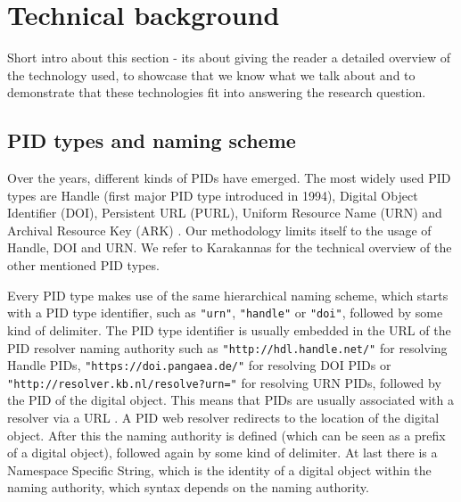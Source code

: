 \section{Technical background}\label{tech-oview}
Short intro about this section - its about giving the reader a detailed overview of the technology used, to showcase that we know what we talk about and to demonstrate that these technologies fit into answering the research question.

\subsection{PID types and naming scheme}\label{pid-types}
Over the years, different kinds of PIDs have emerged. The most widely used PID types are Handle (first major PID type introduced 
in 1994), Digital Object Identifier (DOI), Persistent URL (PURL), Uniform Resource Name (URN) and 
Archival Resource Key (ARK) \cite{pid-oview, odin, hdl}. Our methodology limits itself to the usage of Handle, DOI and URN. We refer to Karakannas \cite{icn-bd} for the technical overview of the other mentioned PID types. 

Every PID type makes use of the same hierarchical naming scheme, which starts with a PID type identifier,
 such as \texttt{"urn"}, \texttt{"handle"} or \texttt{"doi"}, followed by some kind of delimiter. The PID type identifier is usually embedded in the URL of the PID resolver naming authority 
such as \texttt{"http://hdl.handle.net/"} for resolving Handle PIDs, \texttt{"https://doi.pangaea.de/"} for resolving DOI PIDs or \texttt{"http://resolver.kb.nl/resolve?urn="} for resolving URN PIDs, followed by the PID of the digital object. This means that PIDs are usually associated with a resolver via a URL \cite{ids, icn-bd}. A PID web resolver redirects to the location of the digital object.
After this the naming authority is defined (which can be seen as a prefix of a digital object), followed again 
by some kind of delimiter. At last there is a Namespace Specific String, which is the identity of a digital object within the naming authority, which syntax depends on the naming
authority.


